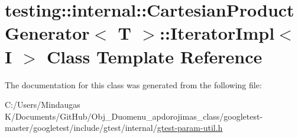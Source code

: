 \hypertarget{classtesting_1_1internal_1_1_cartesian_product_generator_1_1_iterator_impl}{}\section{testing\+::internal\+::Cartesian\+Product\+Generator$<$ T $>$\+::Iterator\+Impl$<$ I $>$ Class Template Reference}
\label{classtesting_1_1internal_1_1_cartesian_product_generator_1_1_iterator_impl}


The documentation for this class was generated from the following file\+:\begin{DoxyCompactItemize}
\item 
C\+:/\+Users/\+Mindaugas K/\+Documents/\+Git\+Hub/\+Obj\+\_\+\+Duomenu\+\_\+apdorojimas\+\_\+class/googletest-\/master/googletest/include/gtest/internal/\mbox{\hyperlink{googletest-master_2googletest_2include_2gtest_2internal_2gtest-param-util_8h}{gtest-\/param-\/util.\+h}}\end{DoxyCompactItemize}
